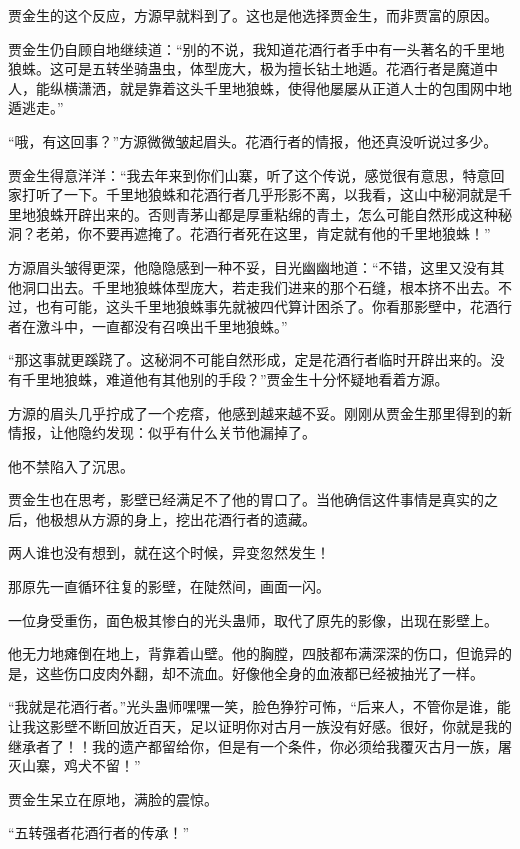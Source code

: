 \begin{this_body}
贾金生的这个反应，方源早就料到了。这也是他选择贾金生，而非贾富的原因。

贾金生仍自顾自地继续道：“别的不说，我知道花酒行者手中有一头著名的千里地狼蛛。这可是五转坐骑蛊虫，体型庞大，极为擅长钻土地遁。花酒行者是魔道中人，能纵横潇洒，就是靠着这头千里地狼蛛，使得他屡屡从正道人士的包围网中地遁逃走。”

“哦，有这回事？”方源微微皱起眉头。花酒行者的情报，他还真没听说过多少。

贾金生得意洋洋：“我去年来到你们山寨，听了这个传说，感觉很有意思，特意回家打听了一下。千里地狼蛛和花酒行者几乎形影不离，以我看，这山中秘洞就是千里地狼蛛开辟出来的。否则青茅山都是厚重粘绵的青土，怎么可能自然形成这种秘洞？老弟，你不要再遮掩了。花酒行者死在这里，肯定就有他的千里地狼蛛！”

方源眉头皱得更深，他隐隐感到一种不妥，目光幽幽地道：“不错，这里又没有其他洞口出去。千里地狼蛛体型庞大，若走我们进来的那个石缝，根本挤不出去。不过，也有可能，这头千里地狼蛛事先就被四代算计困杀了。你看那影壁中，花酒行者在激斗中，一直都没有召唤出千里地狼蛛。”

“那这事就更蹊跷了。这秘洞不可能自然形成，定是花酒行者临时开辟出来的。没有千里地狼蛛，难道他有其他别的手段？”贾金生十分怀疑地看着方源。

方源的眉头几乎拧成了一个疙瘩，他感到越来越不妥。刚刚从贾金生那里得到的新情报，让他隐约发现：似乎有什么关节他漏掉了。

他不禁陷入了沉思。

贾金生也在思考，影壁已经满足不了他的胃口了。当他确信这件事情是真实的之后，他极想从方源的身上，挖出花酒行者的遗藏。

两人谁也没有想到，就在这个时候，异变忽然发生！

那原先一直循环往复的影壁，在陡然间，画面一闪。

一位身受重伤，面色极其惨白的光头蛊师，取代了原先的影像，出现在影壁上。

他无力地瘫倒在地上，背靠着山壁。他的胸膛，四肢都布满深深的伤口，但诡异的是，这些伤口皮肉外翻，却不流血。好像他全身的血液都已经被抽光了一样。

“我就是花酒行者。”光头蛊师嘿嘿一笑，脸色狰狞可怖，“后来人，不管你是谁，能让我这影壁不断回放近百天，足以证明你对古月一族没有好感。很好，你就是我的继承者了！！我的遗产都留给你，但是有一个条件，你必须给我覆灭古月一族，屠灭山寨，鸡犬不留！”

贾金生呆立在原地，满脸的震惊。

“五转强者花酒行者的传承！”


\end{this_body}
